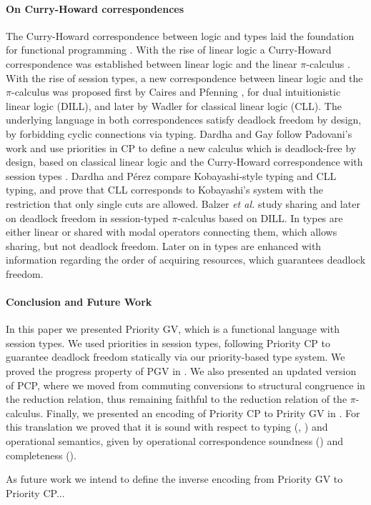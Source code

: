 \documentclass[main.tex]{subfiles}
\begin{document}
\paragraph{On Curry-Howard correspondences}
The Curry-Howard correspondence between logic and types laid the foundation for functional programming \cite{Wadler15}. With the rise of linear logic \cite{Girard87} a Curry-Howard correspondence was established between linear logic and the linear $\pi$-calculus \cite{Abramsky94,BellinS94}. With the rise of session types, a new correspondence between linear logic and the $\pi$-calculus was proposed first by Caires and Pfenning \cite{CP10}, for dual intuitionistic linear logic (DILL), and later by Wadler \cite{wadler2012} for classical linear logic (CLL). The underlying language in both correspondences satisfy deadlock freedom by design, by forbidding cyclic connections via typing. Dardha and Gay follow Padovani's work \cite{P14} and use priorities in CP to define a new calculus which is deadlock-free by design, based on classical linear logic \cite{Girard87}  and the Curry-Howard correspondence with session types \cite{wadler2012}. Dardha and P\'{e}rez \cite{DardhaP15} compare Kobayashi-style typing and CLL typing, and prove that CLL corresponds to Kobayashi's system with the restriction that only single cuts are allowed. Balzer \emph{et al.} study sharing \cite{BalzerP17} and later on deadlock freedom \cite{BalzerTP19} in session-typed $\pi$-calculus based on DILL. In \cite{BalzerP17} types are either linear or shared with modal operators connecting them, which allows sharing, but not deadlock freedom. Later on in \cite{BalzerTP19} types are enhanced with information regarding the order of acquiring resources, which guarantees deadlock freedom.

\paragraph{Conclusion and Future Work}
In this paper we presented Priority GV, which is a functional language with session types. We used priorities in session types, following Priority CP \cite{dardha2018} to guarantee deadlock freedom statically via our priority-based type system. We proved the progress property of PGV in . We also presented an updated version of PCP, where we moved from commuting conversions to structural congruence in the reduction relation, thus remaining faithful to the reduction relation of the $\pi$-calculus. Finally, we presented an encoding of Priority CP to Pririty GV in . For this translation we proved that it is sound with respect to typing (, ) and operational semantics, given by operational correspondence soundness () and completeness ().

As future work we intend to define the inverse encoding from Priority GV to Priority CP...
\end{document}
